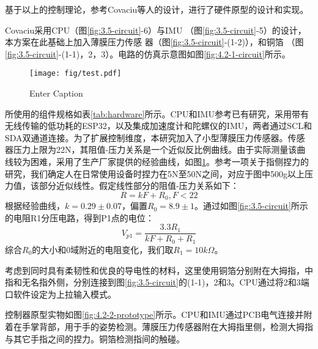 基于以上的控制理论，参考Covaciu\cites{covaciu2022control}等人的设计，进行了硬件原型的设计和实现。

Covaciu\cites{covaciu2022control}采用CPU（图\ref{fig:3.5-circuit}-6）与IMU （图\ref{fig:3.5-circuit}-5）的设计，本方案在此基础上加入薄膜压力传感
器（图\ref{fig:3.5-circuit}-(1-2)），和铜箔 （图\ref{fig:3.5-circuit}-(1-1)，2，3）。电路的仿真示意图如图\ref{fig:4.2-1-circuit}所示。

\begin{figure}[t]
    \centering
    \texttt{[image: fig/test.pdf]}
    \caption{Enter Caption}
    \label{fig:placeholder}
\end{figure}

所使用的组件规格如表\ref{tab:hardware}所示。CPU和IMU参考已有研究\cites{covaciu2022control}，采用带有无线传输的低功耗的ESP32，以及集成加速度计和陀螺仪的IMU，两者通过SCL和SDA双通道连接。为了扩展控制维度，本研究加入了小型薄膜压力传感器。传感器压力上限为22N，其阻值-压力关系是一个近似反比例曲线。由于实际测量该曲线较为困难，采用了生产厂家提供的经验曲线，如图\ref{fig:placeholder}。参考一项关于指侧捏力的研究\cites{呼慧敏2022中国成年人指侧捏力测量研究}，我们确定人在日常使用设备时捏力在5N至50N之间，对应于图中500g以上压力值，该部分近似线性。假定线性部分的阻值-压力关系如下：
$$
R = kF+R_0, F<22
$$
根据经验曲线，$k=0.29\pm 0.07$，偏置$R_0=8.9\pm1$。通过如图\ref{fig:3.5-circuit}所示的电阻R1分压电路，得到P1点的电位：
$$
V_{p1} = \frac{3.3R_1}{kF+R_0+R_1}
$$
综合$R_0$的大小和0域附近的电阻变化，我们取$R_1=10k\Omega$。

考虑到同时具有柔韧性和优良的导电性的材料，这里使用铜箔分别附在大拇指，中指和无名指外侧，分别连接到图\ref{fig:3.5-circuit}的(1-1)，2和3。CPU通过将2和3端口软件设定为上拉输入模式。

控制器原型实物如图\ref{fig:4.2-2-prototype}所示。CPU和IMU通过PCB电气连接并附着在手掌背部，用于手的姿势检测。薄膜压力传感器附在大拇指里侧，检测大拇指与其它手指之间的捏力。铜箔检测指间的触碰。

